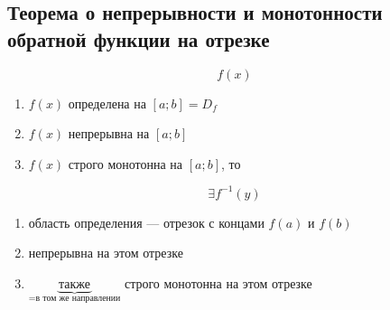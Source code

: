 \subsection{Теорема о непрерывности и монотонности обратной функции на отрезке}
\begin{theorem}
	$$f(x)$$
	\begin{enumerate}
		\item[1)] $f(x)$ определена на $[a;b]=D_f$ 
		\item[2)] $f(x)$ непрерывна на $[a;b]$
		\item[3)] $f(x)$ строго монотонна на $[a;b]$, то
	\end{enumerate}
	$$\exists f^{-1}(y)$$
	\begin{enumerate}
		\item[1)] область определения --- отрезок с концами $f(a)$ и $f(b)$
		\item[2)] непрерывна на этом отрезке 
		\item[3)] $\underbrace{\text{также}}_{\text{=в том же направлении}}$ строго монотонна на этом отрезке
	\end{enumerate}
\end{theorem}
